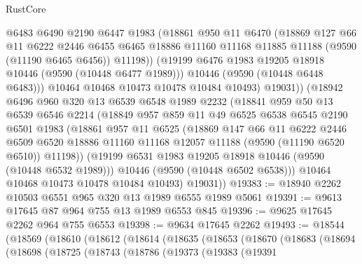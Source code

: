 \begin{lexlean}{RustCore}
\begin{coremodule}
              @6483
              @6490
              @2190
              @6447
              @1983
              (@18861
                @950
                @11
                @6470
                (@18869
                  @127
                  @66
                  @11
                  @6222
                  @2446
                  @6455
                  @6465
                  @18886
                  @11160
                  @11168
                  @11885
                  @11188
                  (@9590 (@11190 @6465 @6456))
                  @11198))
              (@19199 @6476 @1983 @19205 @18918 @10446 (@9590 (@10448 @6477 @1989)))
              @10446
              (@9590 (@10448 @6448 @6483)))
            @10464
            @10468
            @10473
            @10478
            @10484
            @10493)
          @19031))
      (@18942
        @6496
        @960
        @320
        @13
        @6539
        @6548
        @1989
        @2232
        (@18841
          @959
          @50
          @13
          @6539
          @6546
          @2214
          (@18849
            @957
            @859
            @11
            @49
            @6525
            @6538
            @6545
            @2190
            @6501
            @1983
            (@18861
              @957
              @11
              @6525
              (@18869
                @147
                @66
                @11
                @6222
                @2446
                @6509
                @6520
                @18886
                @11160
                @11168
                @12057
                @11188
                (@9590 (@11190 @6520 @6510))
                @11198))
            (@19199 @6531 @1983 @19205 @18918 @10446 (@9590 (@10448 @6532 @1989)))
            @10446
            (@9590 (@10448 @6502 @6538)))
          @10464
          @10468
          @10473
          @10478
          @10484
          @10493)
        @19031))
@19383 := @18940 @2262 @10503 @6551 @965 @320 @13 @1989 @6555 @1989 @5061
@19391 := @9613 @17645 @87 @964 @755 @13 @1989 @6553 @845
@19396 := @9625 @17645 @2262 @964 @755 @6553
@19398 := @9634 @17645 @2262
@19493 := @18544
    (@18569
      (@18610
        (@18612
          (@18614
            (@18635
              (@18653
                (@18670
                  (@18683
                    (@18694
                      (@18698
                        (@18725
                          (@18743
                            (@18786
                              (@19373
                                (@19383
                                  (@19391

\end{coremodule}
\end{lexlean}
